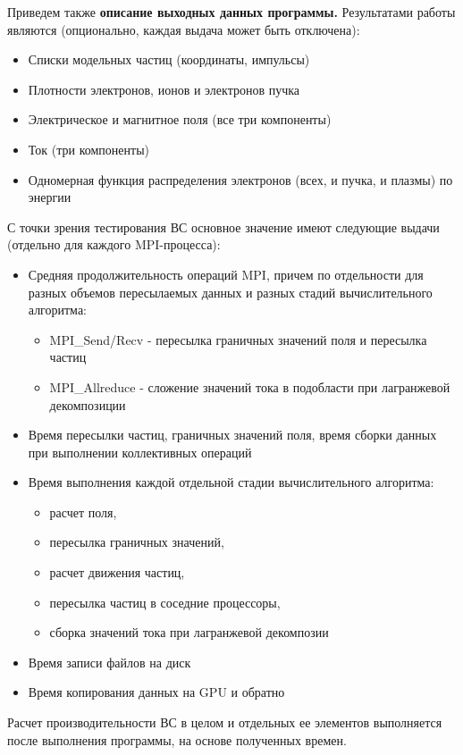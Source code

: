 Приведем также
\textbf{описание выходных данных программы.}
Результатами работы являются
(опционально, каждая выдача может быть отключена):
\begin{itemize}
	\item Списки модельных частиц (координаты, импульсы)
	\item Плотности электронов, ионов и электронов пучка
	\item Электрическое и магнитное поля (все три компоненты)
	\item Ток (три компоненты)
	\item Одномерная функция распределения электронов (всех, и пучка, и плазмы) по энергии
\end{itemize}

С точки зрения тестирования ВС основное значение имеют следующие выдачи (отдельно для каждого MPI-процесса):

\begin{itemize}
	\item Средняя продолжительность операций MPI, причем по отдельности для разных объемов пересылаемых данных и разных стадий вычислительного алгоритма:
\begin{itemize}
	\item MPI\_Send/Recv - пересылка граничных значений поля и пересылка частиц
	\item MPI\_Allreduce - сложение значений тока в подобласти при лагранжевой декомпозиции
	
\end{itemize}	
	\item Время пересылки частиц, граничных значений поля, время сборки данных при выполнении коллективных операций   
	\item Время выполнения каждой отдельной стадии вычислительного алгоритма:
\begin{itemize}
	\item расчет поля, 
	\item пересылка граничных значений, 
	\item расчет движения частиц, 
	\item пересылка частиц в соседние процессоры, 
	\item сборка значений тока при лагранжевой декомпозии
\end{itemize}
	\item Время записи файлов на диск 
	\item Время копирования данных на GPU и обратно
	
\end{itemize}
Расчет производительности ВС в целом и отдельных ее элементов выполняется после выполнения программы, на основе полученных времен. 

